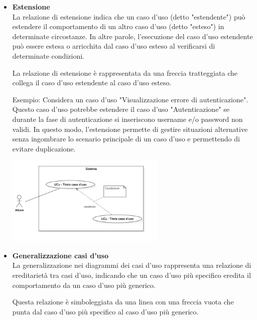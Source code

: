 \begin{itemize}
\begin{itemize}
        \pagebreak

        \item \textbf{Estensione} \\
        La relazione di estensione indica che un caso d'uso (detto "estendente") può estendere il comportamento di un altro caso d'uso (detto "esteso") in determinate circostanze. In altre parole, l'esecuzione del caso d'uso estendente può essere estesa o arricchita dal caso d'uso esteso al verificarsi di determinate condizioni.

        La relazione di estensione è rappresentata da una freccia tratteggiata che collega il caso d'uso estendente al caso d'uso esteso.
        
        Esempio: Considera un caso d'uso "Visualizzazione errore di autenticazione". Questo caso d'uso potrebbe estendere il caso d'uso "Autenticazione" se durante la fase di autenticazione si inseriscono username e/o password non validi. In questo modo, l'estensione permette di gestire situazioni alternative senza ingombrare lo scenario principale di un caso d'uso e permettendo di evitare duplicazione.

        \vspace{0.6cm}
        
        \begin{minipage}[H]{\linewidth}
            \centering
            \includegraphics[width=0.6\textwidth]{../Images/NormeDiProgetto/Estensione.PNG}
        \end{minipage}
        \pagebreak

        \item \textbf{Generalizzazione casi d'uso} \\
        La generalizzazione nei diagrammi dei casi d'uso rappresenta una relazione di ereditarietà tra casi d'uso, indicando che un caso d'uso più specifico eredita il comportamento da un caso d'uso più generico.

        Questa relazione è simboleggiata da una linea con una freccia vuota che punta dal caso d'uso più specifico al caso d'uso più generico.


\end{itemize}
\end{itemize}

